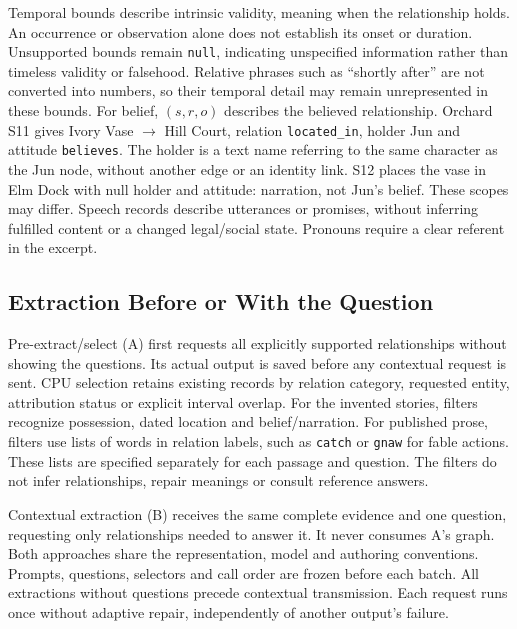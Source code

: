 \documentclass[a4paper,twoside]{article}
\begin{document}
Temporal bounds describe intrinsic validity, meaning when the relationship holds. An occurrence or observation alone does not establish its onset or duration. Unsupported bounds remain \texttt{null}, indicating unspecified information rather than timeless validity or falsehood. Relative phrases such as ``shortly after'' are not converted into numbers, so their temporal detail may remain unrepresented in these bounds.
For belief, $(s,r,o)$ describes the believed relationship. Orchard S11 gives Ivory Vase $\rightarrow$ Hill Court, relation \texttt{located\_in}, holder Jun and attitude \texttt{believes}. The holder is a text name referring to the same character as the Jun node, without another edge or an identity link. S12 places the vase in Elm Dock with null holder and attitude: narration, not Jun's belief. These scopes may differ. Speech records describe utterances or promises, without inferring fulfilled content or a changed legal/social state. Pronouns require a clear referent in the excerpt.



\subsection{Extraction Before or With the Question}
\noindent Pre-extract/select (A) first requests all explicitly supported relationships without showing the questions. Its actual output is saved before any contextual request is sent. CPU selection retains existing records by relation category, requested entity, attribution status or explicit interval overlap. For the invented stories, filters recognize possession, dated location and belief/narration. For published prose, filters use lists of words in relation labels, such as \texttt{catch} or \texttt{gnaw} for fable actions. These lists are specified separately for each passage and question. The filters do not infer relationships, repair meanings or consult reference answers.

Contextual extraction (B) receives the same complete evidence and one question, requesting only relationships needed to answer it. It never consumes A's graph. Both approaches share the representation, model and authoring conventions. Prompts, questions, selectors and call order are frozen before each batch. All extractions without questions precede contextual transmission. Each request runs once without adaptive repair, independently of another output's failure.
\end{document}

